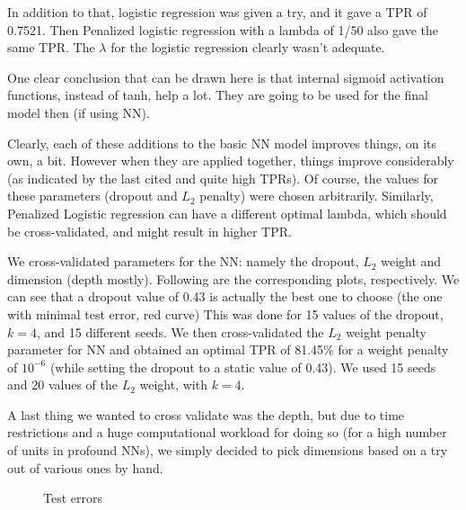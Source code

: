 \documentclass{article} %
\begin{document}
In addition to that, logistic regression was given a try, and it gave a TPR of 0.7521. Then Penalized logistic regression with a lambda of 1/50 also gave the same TPR. The $\lambda$ for the logistic regression clearly wasn’t adequate.

One clear conclusion that can be drawn here is that internal sigmoid activation functions, instead of tanh, help a lot. They are going to be used for the final model then (if using NN).

Clearly, each of these additions to the basic NN model improves things, on its own, a bit. However when they are applied together, things improve considerably (as indicated by the last cited and quite high TPRs). Of course, the values for these parameters (dropout and $L_2$ penalty) were chosen arbitrarily. Similarly, Penalized Logistic regression can have a different optimal lambda, which should be cross-validated, and might result in higher TPR. 

We cross-validated parameters for the NN: namely the dropout, $L_2$ weight and dimension (depth mostly). Following are the corresponding plots, respectively. We can see that a dropout value of 0.43 is actually the best one to choose (the one with minimal test error, red curve) This was done for 15 values of the dropout, $k=4$, and 15 different seeds. We then cross-validated the $L_2$ weight penalty parameter for NN and obtained an optimal TPR of 81.45\% for a weight penalty of $10^{-6}$ (while setting the dropout to a static value of 0.43). We used 15 seeds and 20 values of the $L_2$ weight, with $k = 4$.

A last thing we wanted to cross validate was the depth, but due to time restrictions and a huge computational workload for doing so (for a high number of units in profound NNs), we simply decided to pick dimensions based on a try out of various ones by hand.
\begin{figure}
\centering     %
{}
\caption{Test errors}
\end{figure}
\end{document}
